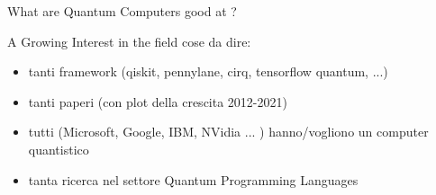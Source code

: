 \begin{frame}[fragile]{What are Quantum Computers good at ?}
    \begin{figure}[!htb]
         \quad
		  \quad
    \end{figure}
\end{frame}


\begin{frame}[fragile]{A Growing Interest in the field}
	cose da dire: 
	\begin{itemize}
	 \item tanti framework (qiskit, pennylane, cirq, tensorflow quantum, ...)
	 \item  tanti paperi (con plot della crescita 2012-2021)
	 \item  tutti (Microsoft, Google, IBM, NVidia ... ) hanno/vogliono un computer quantistico
	 \item  tanta ricerca nel settore Quantum Programming Languages
	\end{itemize}
\end{frame}